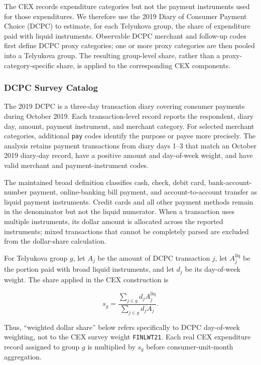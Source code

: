 \documentclass[11pt]{article}
\begin{document}
The CEX records expenditure categories but not the payment instruments used for those expenditures. We therefore use the 2019 Diary of Consumer Payment Choice (DCPC) to estimate, for each Telyukova group, the share of expenditure paid with liquid instruments. Observable DCPC merchant and follow-up codes first define DCPC proxy categories; one or more proxy categories are then pooled into a Telyukova group. The resulting group-level share, rather than a proxy-category-specific share, is applied to the corresponding CEX components.

\subsubsection{DCPC Survey Catalog} 

The 2019 DCPC is a three-day transaction diary covering consumer payments during October 2019. Each transaction-level record reports the respondent, diary day, amount, payment instrument, and merchant category. For selected merchant categories, additional \lstinline|pay| codes identify the purpose or payee more precisely. The analysis retains payment transactions from diary days 1--3 that match an October 2019 diary-day record, have a positive amount and day-of-week weight, and have valid merchant and payment-instrument codes.

The maintained broad definition classifies cash, check, debit card, bank-account-number payment, online-banking bill payment, and account-to-account transfer as liquid payment instruments. Credit cards and all other payment methods remain in the denominator but not the liquid numerator. When a transaction uses multiple instruments, its dollar amount is allocated across the reported instruments; mixed transactions that cannot be completely parsed are excluded from the dollar-share calculation.

For Telyukova group $g$, let $A_j$ be the amount of DCPC transaction $j$, let $A_j^{\mathrm{liq}}$ be the portion paid with broad liquid instruments, and let $d_j$ be its day-of-week weight. The share applied in the CEX construction is

\begin{equation}
	\label{eqn:liquid_payment_share}
	s_g
	= \frac{\sum_{j\in g} d_j A_j^{\mathrm{liq}}}
	{\sum_{j\in g} d_j A_j}.
\end{equation}

Thus, ``weighted dollar share'' below refers specifically to DCPC day-of-week weighting, not to the CEX survey weight \lstinline|FINLWT21|. Each real CEX expenditure record assigned to group $g$ is multiplied by $s_g$ before consumer-unit-month aggregation.
\end{document}
